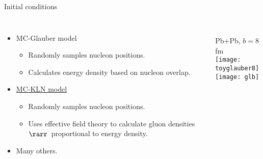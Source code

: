 \documentclass{beamer}
\begin{document}
\begin{frame}[label=ic]{Initial conditions}
  \begin{columns}
    \begin{itemize}
      \item MC-Glauber model
        \begin{itemize}
          \item Randomly samples nucleon positions.
          \item Calculates energy density based on nucleon overlap.
        \end{itemize}
      \item \hyperlink{kln}{MC-KLN model}
        \begin{itemize}
          \item Randomly samples nucleon positions.
          \item Uses effective field theory to calculate gluon densities $\rarr$~proportional to energy density.
        \end{itemize}
      \item Many others.
    \end{itemize}

    \centering
    \ \\
    Pb+Pb, $b = 8$ fm \\
    \texttt{[image: toyglauber8]} \\
    \hspace{-7mm}\texttt{[image: glb]}
  \end{columns}
\end{frame}
\end{document}
